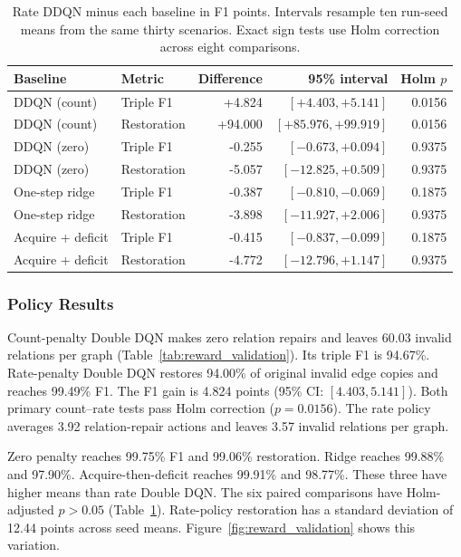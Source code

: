 \begin{table}[t]
\centering
\caption{Rate DDQN minus each baseline in F1 points. Intervals resample ten run-seed means from the same thirty scenarios. Exact sign tests use Holm correction across eight comparisons.}
\label{tab:reward_validation_tests}
\footnotesize
\setlength{\tabcolsep}{3pt}
\begin{tabular*}{\textwidth}{@{\extracolsep{\fill}}llrrr@{}}
\toprule
Baseline & Metric & Difference & 95\% interval & Holm $p$ \\
\midrule
DDQN (count) & Triple F1 & +4.824 & $[+4.403,+5.141]$ & 0.0156 \\
DDQN (count) & Restoration & +94.000 & $[+85.976,+99.919]$ & 0.0156 \\
DDQN (zero) & Triple F1 & -0.255 & $[-0.673,+0.094]$ & 0.9375 \\
DDQN (zero) & Restoration & -5.057 & $[-12.825,+0.509]$ & 0.9375 \\
One-step ridge & Triple F1 & -0.387 & $[-0.810,-0.069]$ & 0.1875 \\
One-step ridge & Restoration & -3.898 & $[-11.927,+2.006]$ & 0.9375 \\
Acquire + deficit & Triple F1 & -0.415 & $[-0.837,-0.099]$ & 0.1875 \\
Acquire + deficit & Restoration & -4.772 & $[-12.796,+1.147]$ & 0.9375 \\
\bottomrule
\end{tabular*}
\end{table}


\subsubsection{Policy Results}

Count-penalty Double DQN makes zero relation repairs and leaves 60.03
invalid relations per graph (Table~\ref{tab:reward_validation}).
Its triple F1 is 94.67\%. Rate-penalty Double DQN restores 94.00\% of
original invalid edge copies and reaches 99.49\% F1.
The F1 gain is 4.824 points (95\% CI: $[4.403,5.141]$).
Both primary count--rate tests pass Holm correction ($p=0.0156$).
The rate policy averages 3.92 relation-repair actions and leaves
3.57 invalid relations per graph.

Zero penalty reaches 99.75\% F1 and 99.06\% restoration.
Ridge reaches 99.88\% and 97.90\%. Acquire-then-deficit reaches 99.91\%
and 98.77\%. These three have higher means than rate Double DQN.
The six paired comparisons have Holm-adjusted $p>0.05$
(Table~\ref{tab:reward_validation_tests}). Rate-policy restoration has
a standard deviation of 12.44 points across seed means.
Figure~\ref{fig:reward_validation} shows this variation.

